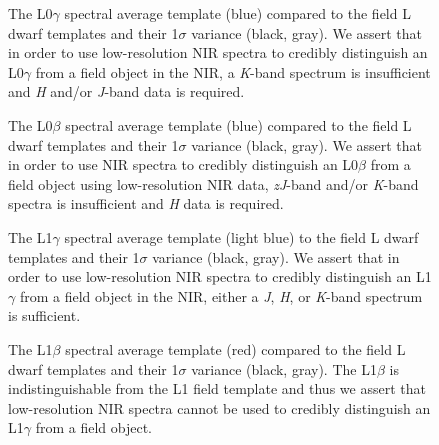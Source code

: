 \documentclass[12pt,preprint]{aastex}
\begin{document}



\begin{figure}
	\caption{The L0$\gamma$ spectral average template (blue) compared to the field L dwarf templates and their 1$\sigma$ variance (black, gray). We assert that in order to use low-resolution NIR spectra to credibly distinguish an L0$\gamma$ from a field object in the NIR, a \emph{K}-band spectrum is insufficient and \emph{H} and/or \emph{J}-band data is required.}
	\label{fig:L0lg-field}
\end{figure}

\begin{figure}
	\caption{The L0$\beta$ spectral average template (blue) compared to the field L dwarf templates and their 1$\sigma$ variance (black, gray). We assert that in order to use NIR spectra to credibly distinguish an L0$\beta$ from a field object using low-resolution NIR data, \emph{zJ}-band and/or \emph{K}-band spectra is insufficient and \emph{H} data is required.}
	\label{fig:L0b-field}
\end{figure}

\begin{figure}
	\caption{The L1$\gamma$ spectral average template (light blue) to the field L dwarf templates and their 1$\sigma$ variance (black, gray). We assert that in order to use low-resolution NIR spectra to credibly distinguish an L1$\gamma$ from a field object in the NIR, either a \emph{J}, \emph{H}, or \emph{K}-band spectrum is sufficient.}
	\label{fig:L1lg-field}
\end{figure}

\begin{figure}
	\caption{The L1$\beta$ spectral average template (red) compared to the field L dwarf templates and their 1$\sigma$ variance (black, gray). The L1$\beta$ is indistinguishable from the L1 field template and thus we assert that low-resolution NIR spectra cannot be used to credibly distinguish an L1$\gamma$ from a field object.}
	\label{fig:L1b-field}
\end{figure}
\end{document}
